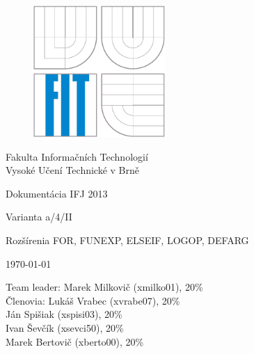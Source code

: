 \documentclass[12pt,a4paper,titlepage,final]{article}
\begin{document}

\def\projname{Dokumentácia IFJ 2013}


\begin{titlepage}

\begin{figure}[!h]
  \centering
  \includegraphics[height=5cm]{doc/img/logo.eps}
\end{figure}
\center Fakulta Informačních Technologií \\
\center Vysoké Učení Technické v Brně \\

\vfill

\begin{center}
\bigskip
\begin{Huge}
\projname\\
\end{Huge}
\begin{large}
Varianta a/4/II\\
{\scriptsize Rozšírenia FOR, FUNEXP, ELSEIF, LOGOP, DEFARG \par}
\end{large}
\end{center}

\vfill

\begin{center}
\begin{Large}
\today
\end{Large}
\end{center}

\vfill

\begin{flushleft}
\begin{large}
Team leader: Marek Milkovič (xmilko01), 20\% \\
Členovia: Lukáš Vrabec (xvrabe07), 20\% \\
\hspace{57px} Ján Spišiak (xspisi03), 20\% \\
\hspace{57px} Ivan Ševčík (xsevci50), 20\% \\
\hspace{57px} Marek Bertovič (xberto00), 20\% \\
\end{large}
\end{flushleft}
\end{titlepage}
\end{document}
